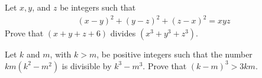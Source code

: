 \documentclass{subfile}
\begin{document}
	\begin{problem}
		Let $x, y$, and $z$ be integers such that
			\begin{align*}
				(x-y)^2+(y-z)^2+(z-x)^2 = xyz
			\end{align*}
		Prove that $(x+y+z+6)$ divides $(x^3+y^3+z^3)$.
	\end{problem}


	\begin{problem}
		Let $k$ and $m$, with $k > m$, be positive integers such that the number $km(k^2 - m^2)$ is divisible by $k^3 - m^3$. Prove that $(k - m)^3 > 3km$. %
	\end{problem}

%
%
\end{document}
